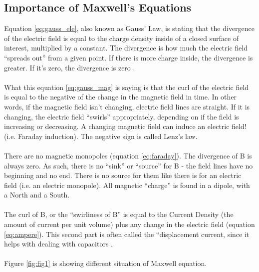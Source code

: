 \subsection{Importance of Maxwell's Equations}
Equation \ref{eq:gauss_ele}, also known as Gauss’ Law, is stating that the divergence of the electric field is equal to the charge density inside of a closed surface of interest, multiplied by a constant. The divergence is how much the electric field “spreads out” from a given point. If there is more charge inside, the divergence is greater. If it’s zero, the divergence is zero \cite{Baillet200114}.
\\
\\
What this equation \ref{eq:gauss_mag} is saying is that the curl of the electric field is equal to the negative of the change in the magnetic field in time. In other words, if the magnetic field isn’t changing, electric field lines are straight. If it is changing, the electric field “swirls” appropriately, depending on if the field is increasing or decreasing. A changing magnetic field can induce an electric field! (i.e. Faraday induction). The negative sign is called Lenz’s law.
\\
\\
There are no magnetic monopoles (equation \ref{eq:faraday}). The divergence of B is always zero. As such, there is no “sink” or “source” for B - the field lines have no beginning and no end. There is no source for them like there is for an electric field (i.e. an electric monopole). All magnetic “charge” is found in a dipole, with a North and a South.
\\
\\
The curl of B, or the “swirliness of B” is equal to the Current Density (the amount of current per unit volume) plus any change in the electric field (equation \ref{eq:ampere}). This second part is often called the “displacement current, since it helps with dealing with capacitors \cite{Yee1966302}.
\\
\\
Figure \ref{fig:fig1} is showing different situation of Maxwell equation.






%
%

%
